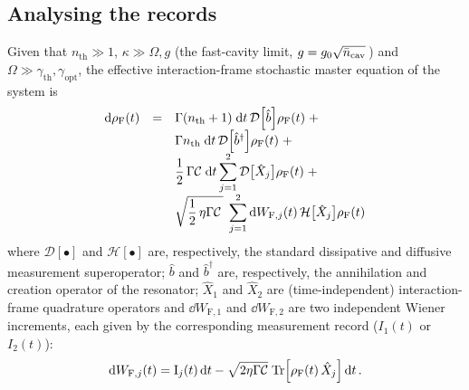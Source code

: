 \documentclass[./Main-revtex.tex]{subfiles}
\begin{document}
\subsection{Analysing the records}\label{SME-ME-&Analysis}
Given that $n_\text{th}\gg1$, $\kappa\gg \Omega,g$ (the fast-cavity limit, $g=g_0\sqrt{\bar{n}_\text{cav}}\,$) and $\Omega\gg\gamma_\text{th},\gamma_\text{opt}$, the effective interaction-frame stochastic master equation of the system is~\cite{doherty2012quantum,khademi2024optomechanical}
\begin{equation}
   \begin{array}{rll}
         \dd{\rho}_\text{F}(t) & = & \Gamma(n_\text{th}+1)\;\dd t\,\mathcal{D}\!\left[\hat{b}\right]\!\rho_\text{F}(t)\;+ \\&&  \Gamma n_\text{th}\;\dd t\,\mathcal{D}\!\left[\hat{b}^\dagger\right]\!\rho_\text{F}(t)\;+ \\&&
         \dfrac{1}{2}\,\Gamma \mathcal{C}\;\dd t\small\displaystyle\sum_{j=1}^{2}\mathcal{D}\!\left[\hat{X}_j\right]\!\rho_\text{F}(t)\;+ \\&& \sqrt{\dfrac{1}{2}\,\eta\Gamma \mathcal{C}\,}\;\small\displaystyle\sum_{j=1}^{2}\dd W_{\text{F},j}(t)\,\mathcal{H}\!\left[\hat{X}_j\right]\!\rho_\text{F}(t)
    \end{array}
\label{UWUQSME_RF_final} 
\end{equation}
where $\mathcal{D}[\bullet]$ and $\mathcal{H}[\bullet]$ are, respectively, the standard dissipative and diffusive measurement superoperator; $\hat{b}$ and $\hat{b}^\dagger$ are, respectively, the annihilation and creation operator of the resonator; $\hat{X}_1$ and $\hat{X}_2$ are (time-independent) interaction-frame quadrature operators and $\dd W_{\text{F},1}$ and $\dd W_{\text{F},2}$ are two independent Wiener increments, each given by the corresponding measurement record ($I_1(t)$ or $I_2(t)$):
\begin{equation}
         {\rm d} W_{\text{F},j}(t) =\text{I}_{j}(t)\,{\rm d} t - \sqrt{2\eta\Gamma \mathcal{C}}\;\text{Tr}\Big[\rho_{\text F}(t)\,\hat{X}_j\Big]\,{\rm d} t\,.
    \label{DemodulatedCurrents}
\end{equation}
\end{document}
